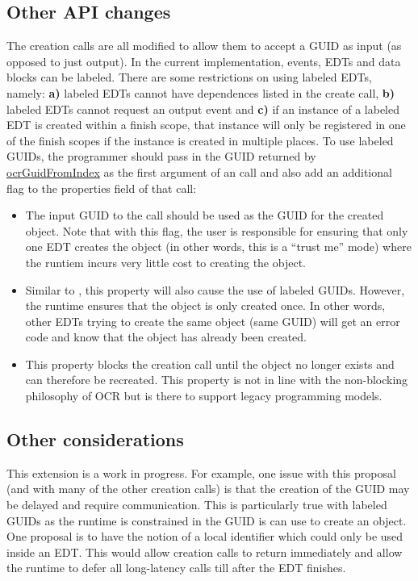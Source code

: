 \subsection{Other API changes}
The creation calls are all modified to allow them to accept a GUID as
input (as opposed to just output). In the current implementation, events, EDTs
and data blocks can be labeled. There are some restrictions on using labeled EDTs,
namely: {\bf a)} labeled EDTs cannot have dependences listed in the create call,
{\bf b)} labeled EDTs cannot request an output event and {\bf c)} if an
instance of a labeled EDT
is created within a finish scope, that instance will only be registered in
one of the finish scopes if the instance is created in multiple places. To use
labeled GUIDs, the programmer should pass in the GUID returned by
\hyperlink{func_ocrGuidFromIndex}{ocrGuidFromIndex} as the first argument of
an  call and also add an
additional flag to the properties field of that call:
\begin{itemize}
\item {} The input GUID to the call should
  be used as the GUID for the created object. Note that with this
  flag, the user is responsible for ensuring that only one EDT creates
  the object (in other words, this is a ``trust me'' mode) where the
  runtiem incurs very little cost to creating the object.
\item {} Similar to
  , this property will also cause the
  use of labeled GUIDs. However, the runtime ensures that the object
  is only created once. In other words, other EDTs trying to create
  the same object (same GUID) will get an error code and know that the
  object has already been created.
\item {} This property blocks the creation call
  until the object no longer exists and can therefore be
  recreated. This property is not in line with the non-blocking
  philosophy of OCR but is there to support legacy programming models.
\end{itemize}
\subsection{Other considerations}
This extension is a work in progress.
For example,
one issue with this proposal (and with many of the other creation
calls) is that the creation of the GUID may be delayed and require
communication. This is particularly true with labeled GUIDs as the
runtime is constrained in the GUID is can use to create an object. One
proposal is to have the notion of a local identifier which could only
be used inside an EDT. This would allow creation calls to return
immediately and allow the runtime to defer all long-latency calls till
after the EDT finishes.

